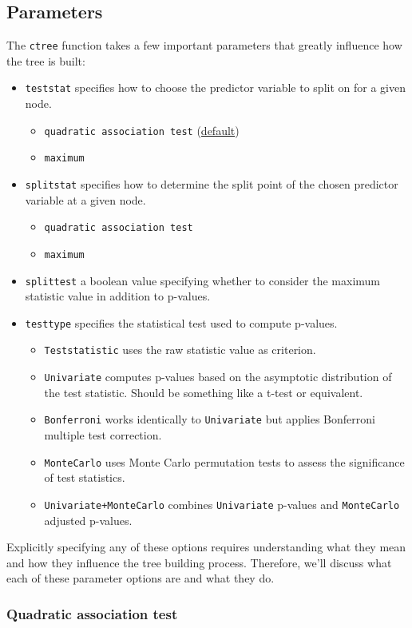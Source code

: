 \subsection{Parameters}
The \verb|ctree| function takes a few important parameters that greatly influence how the tree is built:
\begin{itemize}
    \item \verb|teststat| specifies how to choose the predictor variable to split on for a given node.
    \begin{itemize}
        \item \verb|quadratic association test| (\href{https://rdrr.io/rforge/partykitR1/f/inst/doc/ctree.pdf}{default})
        \item \verb|maximum|
    \end{itemize}
    \item \verb|splitstat| specifies how to determine the split point of the chosen predictor variable at a given node.
    \begin{itemize}
        \item \verb|quadratic association test|
        \item \verb|maximum|
    \end{itemize}
    \item \verb|splittest| a boolean value specifying whether to consider the maximum statistic value in addition to p-values.
    \item \verb|testtype| specifies the statistical test used to compute p-values.
    \begin{itemize}
        \item \verb|Teststatistic| uses the raw statistic value as criterion.
        \item \verb|Univariate| computes p-values based on the asymptotic distribution of the test statistic.
        Should be something like a t-test or equivalent.
        \item \verb|Bonferroni| works identically to \verb|Univariate| but applies Bonferroni multiple test correction.
        \item \verb|MonteCarlo| uses Monte Carlo permutation tests to assess the significance of test statistics.
        \item \verb|Univariate+MonteCarlo| combines \verb|Univariate| p-values and \verb|MonteCarlo| adjusted p-values.
    \end{itemize}
\end{itemize}

Explicitly specifying any of these options requires understanding what they mean and how they influence the tree building process.
Therefore, we'll discuss what each of these parameter options are and what they do.

\subsubsection{Quadratic association test}
